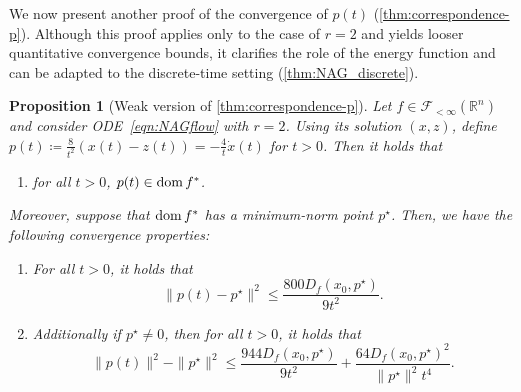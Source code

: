 \documentclass[11pt,a4paper]{article}
\theoremstyle{definition}
\theoremstyle{plain}
\newtheorem{prop}[prop]{Proposition}
\newcommand{\RR}{{\mathbb{R}}}
\newcommand{\dom}{\mathop{\rm dom}}
\begin{document}
We now present another proof of the convergence of $p(t)$ (\cref{thm:correspondence-p}).
Although this proof applies only to the case of $r = 2$ and yields looser quantitative convergence bounds, it clarifies the role of the energy function and can be adapted to the discrete-time setting (\cref{thm:NAG_discrete}).
\begin{prop}[{Weak version of \cref{thm:correspondence-p}}]
    \label{prop:weak}
    Let $f \in \mathcal{F}_{<\infty}(\RR^n)$ and consider ODE~\eqref{eqn:NAGflow} with $r = 2$.
    Using its solution $(x, z)$, define $p(t) \coloneqq \frac{8}{t^2}(x(t) - z(t)) = -\frac{4}t\dot x(t)$ for $t > 0$.
    Then it holds that
    \begin{enumerate}
        \item[(a)] for all $t > 0$, $p(t) \in \dom f^\ast$.
    \end{enumerate}
    Moreover, suppose that $\dom f^\ast$ has a minimum-norm point $p^\star$.
    Then, we have the following convergence properties:
    \begin{enumerate}
        \item[(b)] For all $t > 0$, it holds that
        \[
            \|p(t) - p^\star\|^2 \le \frac{800D_f(x_0, p^\star)}{9t^2}.
        \]
        \item[(c)] Additionally if $p^\star \neq 0$, then for all $t > 0$, it holds that
        \[
            \|p(t)\|^2 - \|p^\star\|^2 \le \frac{944D_f(x_0, p^\star)}{9t^2} + \frac{64D_f(x_0, p^\star)^2}{\|p^\star\|^2t^4}.
        \]
    \end{enumerate}
\end{prop}
\end{document}
